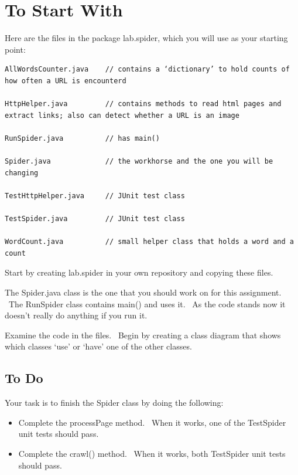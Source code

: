 \documentclass[letterpaper,10pt,openany,oneside]{sphinxmanual}
\begin{document}
\section{To Start With}
\label{TheSpiderLabonecrawler/TheSpiderLabonecrawler:to-start-with}
Here are the files in the package lab.spider, which you will use as
your starting point:

\begin{Verbatim}[commandchars=\\\{\}]
AllWordsCounter.java    // contains a ‘dictionary’ to hold counts of how often a URL is encounterd

HttpHelper.java         // contains methods to read html pages and extract links; also can detect whether a URL is an image

RunSpider.java          // has main()

Spider.java             // the workhorse and the one you will be changing

TestHttpHelper.java     // JUnit test class

TestSpider.java         // JUnit test class

WordCount.java          // small helper class that holds a word and a count
\end{Verbatim}

Start by creating lab.spider in your own repository and copying
these files.

The Spider.java class is the one that you should work on for this
assignment.  The RunSpider class contains main() and uses it.  As
the code stands now it doesn’t really do anything if you run it.

Examine the code in the files.  Begin by creating a class diagram
that shows which classes ‘use’ or ‘have’ one of the other classes.


\subsection{To Do}
\label{TheSpiderLabonecrawler/TheSpiderLabonecrawler:to-do}
Your task is to finish the Spider class by doing the following:
\begin{itemize}
\item {} 
Complete the processPage method.  When it works, one of the TestSpider unit tests should pass.

\item {} 
Complete the crawl() method.  When it works, both TestSpider unit tests should pass.

\end{itemize}
\end{document}
